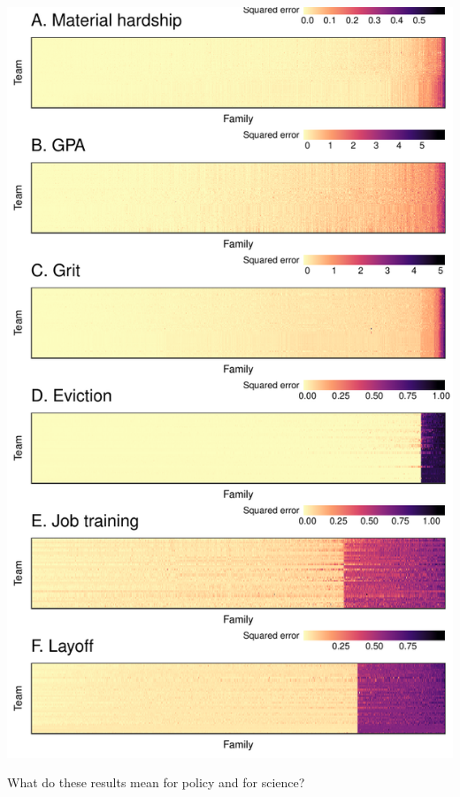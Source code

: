 \documentclass{beamer}
\begin{document}
\begin{frame}
\includegraphics[width = \textwidth, trim = {0 2.72in 0 3.95in}, clip]{figures/4_heatmaps_sqerr_6outcomes}
\end{frame}

\begin{frame}
\end{frame}

\begin{frame}
What do these results mean for policy and for science?
\end{frame}
\end{document}
